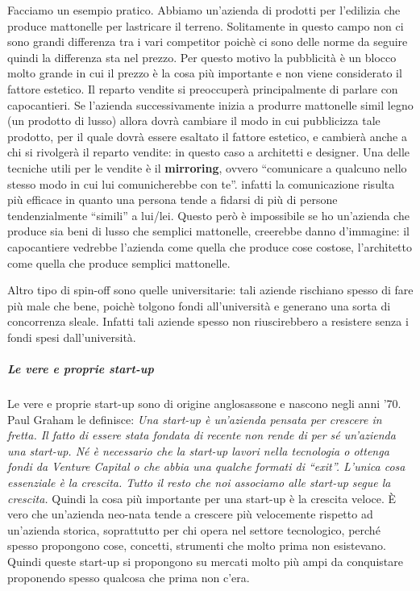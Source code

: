 Facciamo un esempio pratico. Abbiamo un'azienda di prodotti per l'edilizia che
produce mattonelle per lastricare il terreno. Solitamente in questo campo non
ci sono grandi differenza tra i vari competitor poichè ci sono delle norme da
seguire quindi la differenza sta nel prezzo. Per questo motivo la pubblicità è
un blocco molto grande in cui il prezzo è la cosa più importante e non viene
considerato il fattore estetico. Il reparto vendite si preoccuperà
principalmente di parlare con capocantieri. Se l'azienda successivamente inizia
a produrre mattonelle simil legno (un prodotto di lusso) allora dovrà cambiare
il modo in cui pubblicizza tale prodotto, per il quale dovrà essere esaltato il
fattore estetico, e cambierà anche a chi si rivolgerà il reparto vendite: in
questo caso a architetti e designer. Una delle tecniche utili per le vendite è
il \textbf{mirroring}, ovvero ``comunicare a qualcuno nello stesso modo in cui
lui comunicherebbe con te''. infatti la comunicazione risulta più efficace in
quanto una persona tende a fidarsi di più di persone tendenzialmente ``simili''
a lui/lei. Questo però è impossibile se ho un'azienda che produce sia beni di
lusso che semplici mattonelle, creerebbe danno d'immagine: il capocantiere
vedrebbe l'azienda come quella che produce cose costose, l'architetto come
quella che produce semplici mattonelle.

Altro tipo di spin-off sono quelle universitarie: tali aziende rischiano spesso
di fare più male che bene, poichè tolgono fondi all'università e generano una
sorta di concorrenza sleale. Infatti tali aziende spesso non riuscirebbero a
resistere senza i fondi spesi dall'università.

\subparagraph*{Le vere e proprie start-up} Le vere e proprie start-up sono di
origine anglosassone e nascono negli anni '70. Paul Graham le definisce:
\emph{
Una start-up è un'azienda pensata per crescere in fretta. Il fatto di essere
stata fondata di recente non rende di per sé un'azienda una start-up. Né è
necessario che la start-up lavori nella tecnologia o ottenga fondi da Venture
Capital o che abbia una qualche formati di ``exit''. L'unica cosa essenziale è
la crescita. Tutto il resto che noi associamo alle start-up segue la crescita.
}
Quindi la cosa più importante per una start-up è la crescita veloce. 
È vero che un'azienda neo-nata tende a crescere più velocemente rispetto ad
un'azienda storica, soprattutto per chi opera nel settore tecnologico, perché
spesso propongono cose, concetti, strumenti che molto prima non esistevano.
Quindi queste start-up si propongono su mercati molto più ampi da conquistare
proponendo spesso qualcosa che prima non c'era.

